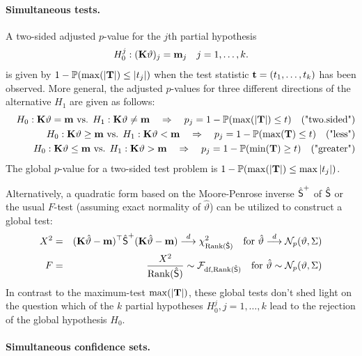\documentclass[12pt]{article}
\begin{document}
\paragraph{Simultaneous tests.}

A two-sided adjusted $p$-value for the $j$th partial hypothesis 
\begin{eqnarray*}
H_0^j: (\K \vartheta)_j = \m_j \quad j = 1, \dots, k.
\end{eqnarray*}
is given by $1 - \Prob(\max(|\T|) \le |t_j|)$ when the test statistic 
$\tt  = (t_1, \dots, t_k)$
has been observed. More general, the adjusted $p$-values for three different
directions of the alternative $H_1$ are given as follows:
\begin{eqnarray*}
& & H_0: \K \vartheta = \m \text{ vs. } H_1: \K \vartheta \not = \m \quad \Rightarrow \quad p_j  =  1 - \Prob(\max(|\T|) \le t) \quad \text{("two.sided")} \\
& & H_0: \K \vartheta \ge \m \text{ vs. } H_1: \K \vartheta < \m  \quad \Rightarrow \quad p_j  =  1 - \Prob(\max(\T) \le t) \quad \text{("less")} \\
& & H_0: \K \vartheta \le \m \text{ vs. } H_1: \K \vartheta > \m \quad \Rightarrow \quad p_j  =  1 - \Prob(\min(\T) \ge t) \quad \text{("greater")}
\end{eqnarray*}
The global $p$-value for a two-sided test problem is $1 - \Prob(\max(|\T|) \le \max|t_j|)$.


Alternatively, a quadratic form based on the Moore-Penrose inverse $\hat{\S}^+$ of 
$\hat{\S}$ or the usual $F$-test (assuming exact normality of $\hat{\vartheta}$) 
can be utilized to construct a global test:
\begin{eqnarray*}
X^2 & = & (\K \hat{\vartheta} - \m)^\top \hat{\S}^+ (\K \hat{\vartheta} - \m) \cL \chi^2_{\Rg(\hat{\S})} 
\quad \text{for } \hat{\vartheta} \cL \N_p(\vartheta, \Sigma) \\
F & = &  \frac{X^2}{\Rg(\hat{\S})} \sim \F_{\text{df}, \Rg(\hat{\S})} \quad \text{for } \hat{\vartheta} \sim \N_p(\vartheta, \Sigma)
\end{eqnarray*}
In contrast to the maximum-test $\max(|\T|)$, these global tests don't shed light 
on the question which of the $k$ partial hypotheses $H_0^j, j = 1, \dots, k$ 
lead to the rejection of the global hypothesis $H_0$. 

\paragraph{Simultaneous confidence sets.}
\end{document}
